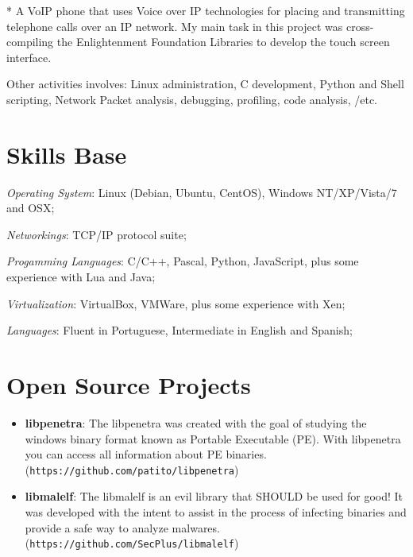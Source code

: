\documentclass[margin]{res}
\begin{document}
\begin{resume}
      * A VoIP phone that uses Voice over IP technologies for placing and transmitting telephone calls over an IP network. 
        My main task in this project was cross-compiling the Enlightenment Foundation Libraries to develop the touch screen
        interface. 

      Other activities involves: Linux administration, C development, Python and Shell scripting, Network Packet analysis, 
      debugging, profiling, code analysis, /etc.
    

\section{Skills Base}  \textit{Operating System}:  Linux (Debian, Ubuntu, CentOS), Windows NT/XP/Vista/7 and OSX;

			\textit{Networkings}: TCP/IP protocol suite;
  
			\textit{Progamming Languages}: C/C++, Pascal, Python, JavaScript, plus some experience with Lua and Java;
  
			\textit{Virtualization}: VirtualBox, VMWare, plus some experience with Xen;

			\textit{Languages}: Fluent in Portuguese, Intermediate in English and Spanish;
 
\section{Open Source Projects}
		\begin{itemize}
		    \vspace{2mm}
		    \item \textbf{libpenetra}: The libpenetra was created with the goal of studying the windows binary format 
		                               known as Portable Executable (PE). With libpenetra you can access all information
		                               about PE binaries. (\texttt{https://github.com/patito/libpenetra}) \vspace{1mm}
		                               
		    \item \textbf{libmalelf}: The libmalelf is an evil library that SHOULD be used for good! It was developed
		                              with the intent to assist in the process of infecting binaries and provide a safe 
		                              way to analyze malwares. (\texttt{https://github.com/SecPlus/libmalelf})\vspace{1mm}
		                              

\end{itemize}
\end{resume}
\end{document}
